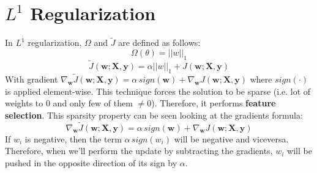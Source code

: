 \section{$L^1$ Regularization}
In $L^1$ regularization, $\Omega$ and $\tilde{J}$ are defined as follows:
\[\Omega(\theta) = ||w||_1\]
\[\tilde{J}(\textbf{w}; \textbf{X}, \textbf{y}) = \alpha ||w||_1 + J(\textbf{w}; \textbf{X}, \textbf{y})\]
With gradient $\nabla_\textbf{w}\tilde{J}(\textbf{w};\textbf{X}, \textbf{y}) = \alpha \, sign(\textbf{w}) + \nabla_\textbf{w}J(\textbf{w};\textbf{X}, \textbf{y})$ where $sign(\cdot)$ is applied element-wise. This technique forces the solution to be sparse (i.e. lot of weights to 0 and only few of them $\neq 0$). Therefore, it performs \textbf{feature selection}.\newline\newline
This sparsity property can be seen looking at the gradients formula:
\[\nabla_\textbf{w}\tilde{J}(\textbf{w};\textbf{X}, \textbf{y}) = \alpha \, sign(\textbf{w}) + \nabla_\textbf{w}J(\textbf{w};\textbf{X}, \textbf{y})\]
If $w_i$ is negative, then the term $\alpha \,sign(w_i)$ will be negative and viceversa. Therefore, when we'll perform the update by subtracting the gradients, $w_i$ will be pushed in the opposite direction of its sign by $\alpha$.

